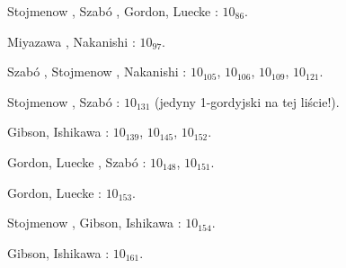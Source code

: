 \begin{compactitem}
%
\item Stojmenow \cite{stoimenow2004}, Szabó \cite{szabo2005}, Gordon, Luecke \cite{gordon2006}: $10_{86}$.
\item Miyazawa \cite{miyazawa1998}, Nakanishi \cite{nakanishi2005}: $10_{97}$.
\item Szabó \cite{szabo2005}, Stojmenow \cite{stoimenow2004}, Nakanishi \cite{nakanishi2005}: $10_{105}$, $10_{106}$, $10_{109}$, $10_{121}$.
\item Stojmenow \cite{stoimenow2004}, Szabó \cite{szabo2005}: $10_{131}$ (jedyny 1-gordyjski na tej liście!).
\item Gibson, Ishikawa \cite{ishikawa2002}: $10_{139}$, $10_{145}$, $10_{152}$.
%
%
\item Gordon, Luecke \cite{gordon2006}, Szabó \cite{szabo2005}: $10_{148}$, $10_{151}$.
\item Gordon, Luecke \cite{gordon2006}: $10_{153}$.
\item Stojmenow \cite{stoimenow2003}, Gibson, Ishikawa \cite{ishikawa2002}: $10_{154}$.
\item Gibson, Ishikawa \cite{ishikawa2002}: $10_{161}$.
\end{compactitem}


